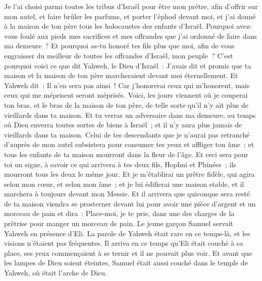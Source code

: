 \begin{multicols}{2}
Je l'ai choisi parmi toutes les tribus d'Israël pour être mon prêtre, afin d'offrir sur mon autel, et faire brûler les parfums, et porter l'éphod devant moi, et j'ai donné à la maison de ton père tous les holocaustes des enfants d'Israël.
Pourquoi avez-vous foulé aux pieds mes sacrifices et mes offrandes que j'ai ordonné de faire dans ma demeure~? Et pourquoi as-tu honoré tes fils plus que moi, afin de vous engraisser du meilleur de toutes les offrandes d'Israël, mon peuple~?
C'est pourquoi voici ce que dit Yahweh, le Dieu d'Israël~: J'avais dit et promis que ta maison et la maison de ton père marcheraient devant moi éternellement. Et Yahweh dit~: Il n'en sera pas ainsi~! Car j'honorerai ceux qui m'honorent, mais ceux qui me méprisent seront méprisés.
Voici, les jours viennent où je couperai ton bras, et le bras de la maison de ton père, de telle sorte qu'il n'y ait plus de vieillards dans ta maison.
Et tu verras un adversaire dans ma demeure, au temps où Dieu enverra toutes sortes de biens à Israël~; et il n'y aura plus jamais de vieillards dans ta maison.
Celui de tes descendants que je n'aurai pas retranché d'auprès de mon autel subsistera pour consumer tes yeux et affliger ton âme~; et tous les enfants de ta maison mourront dans la fleur de l'âge.
Et ceci sera pour toi un signe, à savoir ce qui arrivera à tes deux fils, Hophni et Phinées~; ils mourront tous les deux le même jour.
Et je m'établirai un prêtre fidèle, qui agira selon mon cœur, et selon mon âme~; et je lui édifierai une maison stable, et il marchera à toujours devant mon Messie.
Et il arrivera que quiconque sera resté de ta maison viendra se prosterner devant lui pour avoir une pièce d'argent et un morceau de pain et dira~: Place-moi, je te prie, dans une des charges de la prêtrise pour manger un morceau de pain.
\VerseOne{}Le jeune garçon Samuel servait Yahweh en présence d'Eli. La parole de Yahweh était rare en ce temps-là, et les visions n'étaient pas fréquentes.
Il arriva en ce temps qu'Eli était couché à sa place, ses yeux commençaient à se ternir et il ne pouvait plus voir.
Et avant que les lampes de Dieu soient éteintes, Samuel était aussi couché dans le temple de Yahweh, où était l'arche de Dieu.

\end{multicols}
